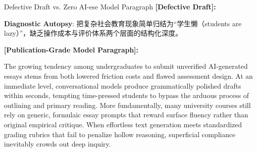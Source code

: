 \begin{ExampleBox}{Defective Draft vs. Zero AI-ese Model Paragraph}
\textbf{\color{TargetHighlight}[Defective Draft]:}\par
{}\par\vspace{4pt}
\textbf{Diagnostic Autopsy}: 把复杂社会教育现象简单归结为“学生懒（students are lazy）”，缺乏操作成本与评价体系两个层面的结构化深度。\par\vspace{6pt}
\textbf{\color{AcadNavy}[Publication-Grade Model Paragraph]:}\par
The growing tendency among undergraduates to submit unverified AI-generated essays stems from both lowered friction costs and flawed assessment design. At an immediate level, conversational models produce grammatically polished drafts within seconds, tempting time-pressed students to bypass the arduous process of outlining and primary reading. More fundamentally, many university courses still rely on generic, formulaic essay prompts that reward surface fluency rather than original empirical critique. When effortless text generation meets standardized grading rubrics that fail to penalize hollow reasoning, superficial compliance inevitably crowds out deep inquiry.
\end{ExampleBox}
